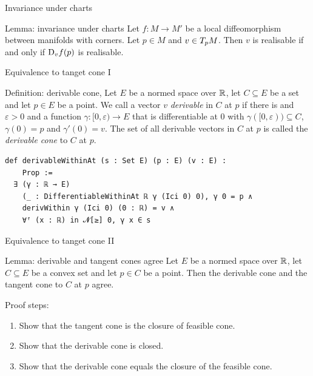 \documentclass{beamer}
\begin{document}
\begin{frame}{Invariance under charts}

\begin{block}{Lemma: invariance under charts}
Let $f \colon M \to M'$ be a local diffeomorphism between manifolds with corners. Let $p \in M$ and $v \in T_{p}M$. Then $v$ is realisable if and only if $\text{D}_{v}f(p)$ is realisable. 
\end{block}

\end{frame}

\begin{frame}[fragile]{Equivalence to tanget cone I}
\small
\begin{block}{Definition: derivable cone, \cite{Melrose1996}}
Let $E$ be a normed space over $\mathbb{R}$, let $C \subseteq E$ be a set and let $p \in E$ be a point. 
We call a vector $v$ \emph{derivable} in $C$ at $p$ if there is and $\varepsilon > 0$ and a function $\gamma \colon [0, \varepsilon) \to E$ that is differentiable at $0$ with $\gamma ([0, \varepsilon)) \subseteq C$, $\gamma (0) = p$ and $\gamma' (0) = v$. 
The set of all derivable vectors in $C$ at $p$ is called the \emph{derivable cone} to $C$ at $p$.
\end{block}

\begin{lstlisting}
def derivableWithinAt (s : Set E) (p : E) (v : E) : 
    Prop :=
  ∃ (γ : ℝ → E) 
    (_ : DifferentiableWithinAt ℝ γ (Ici 0) 0), γ 0 = p ∧
    derivWithin γ (Ici 0) (0 : ℝ) = v ∧ 
    ∀ᶠ (x : ℝ) in 𝓝[≥] 0, γ x ∈ s
\end{lstlisting}
  
\end{frame}
\begin{frame}{Equivalence to tanget cone II}

\begin{block}{Lemma: derivable and tangent cones agree}
Let $E$ be a normed space over $\mathbb{R}$, let $C \subseteq E$ be a convex set and let $p \in C$ be a point. Then the derivable cone and the tangent cone to $C$ at $p$ agree.  

\end{block}

Proof steps: 
\begin{enumerate}
  \item Show that the tangent cone is the closure of feasible cone. 
  \item Show that the derivable cone is closed. 
  \item Show that the derivable cone equals the closure of the feasible cone. 
\end{enumerate}

\end{frame}
\end{document}
